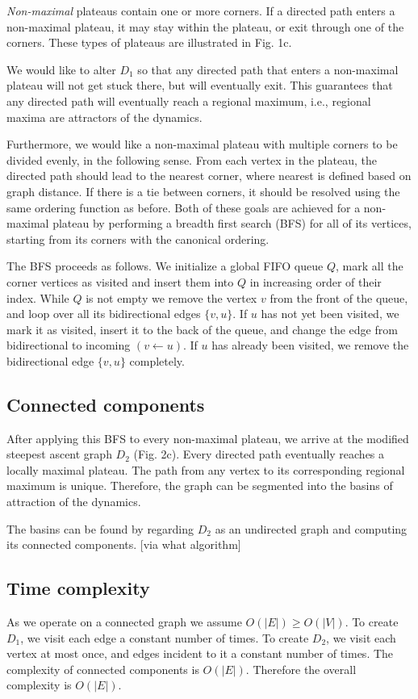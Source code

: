 \documentclass{article}
\begin{document}
\emph{Non-maximal} plateaus contain one or more corners.  If a
directed path enters a non-maximal plateau, it may stay within the
plateau, or exit through one of the corners.  These types
of plateaus are illustrated in Fig. 1c.

We would like to alter $D_1$ so that any directed path that enters a
non-maximal plateau will not get stuck there, but will eventually
exit.  This guarantees that any directed path will eventually reach a
regional maximum, i.e., regional maxima are attractors of the dynamics.

Furthermore, we would like a non-maximal plateau with multiple corners
to be divided evenly, in the following sense.  From each vertex in the
plateau, the directed path should lead to the nearest corner, where
nearest is defined based on graph distance.  If there is a tie between
corners, it should be resolved using the same ordering function as
before.  Both of these goals are achieved for a non-maximal plateau by
performing a breadth first search (BFS) for all of its vertices,
starting from its corners with the canonical ordering.

The BFS proceeds as follows.  We initialize a global FIFO queue $Q$,
mark all the corner vertices as visited and insert them into $Q$ in
increasing order of their index. While $Q$ is not empty we remove the
vertex $v$ from the front of the queue, and loop over all its
bidirectional edges $\{v,u\}$.  If $u$ has not yet been visited, we
mark it as visited, insert it to the back of the queue, and change the
edge from bidirectional to incoming $(v\leftarrow u)$. If $u$ has
already been visited, we remove the bidirectional edge $\{v,u\}$
completely.

\subsection{Connected components}
After applying this BFS to every non-maximal plateau, we arrive at the
modified steepest ascent graph $D_2$ (Fig. 2c).  Every directed path eventually reaches a locally maximal plateau.  The path from any vertex to its corresponding regional maximum is unique.  Therefore, the graph can be segmented into the basins of attraction of the dynamics.

The basins can be found by regarding $D_2$ as an undirected graph and
computing its connected components.  [via what algorithm]

\subsection{Time complexity}
As we operate on a connected graph we assume $O(|E|) \ge O(|V|)$.  To
create $D_1$, we visit each edge a constant number of times. To create
$D_2$, we visit each vertex at most once, and edges incident to it a
constant number of times. The complexity of connected components is
$O(|E|)$.  Therefore the overall complexity is $O(|E|)$.
\end{document}
